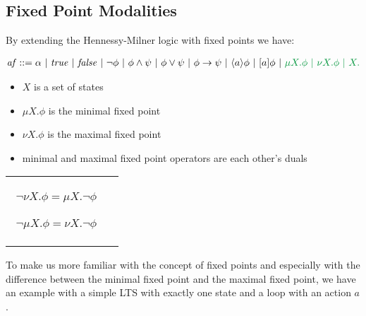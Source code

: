 \documentclass{clseminar}
\begin{document}
  \subsection{Fixed Point Modalities}

  By extending the Hennessy-Milner logic with fixed points we have:

  \begin{align*}
    \mathit{af} ::= \alpha\ |\ \mathit{true}\ |\ \mathit{false}\ |\ \neg \phi\ |\ \phi \land \psi\ |\ \phi \lor \psi\ |\ \phi \to \psi\ |\ \langle a \rangle \phi \ |\ [a]\phi\ |\ \color{green} \mu X. \phi \ |\ \nu X. \phi \ |\ X.
  \end{align*}

  \begin{itemize}
    \item $X$ is a set of states
    \item $\mu X. \phi$ is the minimal fixed point
    \item $\nu X. \phi$ is the maximal fixed point
    \item minimal and maximal fixed point operators are each other's duals
  \end{itemize}
  \begin{tabular}{cc}
    \begin{minipage}{.47\linewidth}
      \begin{align*}
        \neg \nu X. \phi = \mu X. \neg \phi
      \end{align*}
    \end{minipage}
    \begin{minipage}{.47\linewidth}
      \begin{align*}
        \neg \mu X. \phi = \nu X. \neg \phi
      \end{align*}
    \end{minipage}
  \end{tabular}

  To make us more familiar with the concept of fixed points and especially with the difference between the minimal fixed point and the maximal fixed point, we have an example with a simple LTS with exactly one state and a loop with an action $a$. \\

  \begin{center}
  \end{center}
\end{document}
